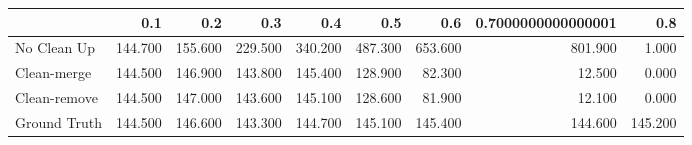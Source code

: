 \begin{tabular}{lrrrrrrrr}
\toprule
{} &     0.1 &     0.2 &     0.3 &     0.4 &     0.5 &     0.6 & 0.7000000000000001 &     0.8 \\
\midrule
No Clean Up  & 144.700 & 155.600 & 229.500 & 340.200 & 487.300 & 653.600 &            801.900 &   1.000 \\
Clean-merge  & 144.500 & 146.900 & 143.800 & 145.400 & 128.900 &  82.300 &             12.500 &   0.000 \\
Clean-remove & 144.500 & 147.000 & 143.600 & 145.100 & 128.600 &  81.900 &             12.100 &   0.000 \\
Ground Truth & 144.500 & 146.600 & 143.300 & 144.700 & 145.100 & 145.400 &            144.600 & 145.200 \\
\bottomrule
\end{tabular}
